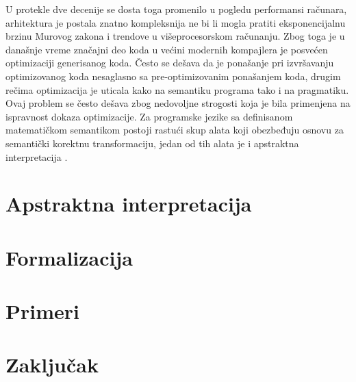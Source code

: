 \documentclass[a4paper]{article}
\begin{document}
U protekle dve decenije se dosta toga promenilo u pogledu performansi računara, arhitektura je postala znatno kompleksnija ne bi li mogla pratiti eksponencijalnu brzinu Murovog zakona i trendove u višeprocesorskom računanju. Zbog toga je u  današnje vreme značajni deo koda u većini modernih kompajlera je posvećen optimizaciji generisanog koda. Često se dešava da je ponašanje pri izvršavanju optimizovanog koda nesaglasno sa pre-optimizovanim ponašanjem koda, drugim rečima optimizacija je uticala kako na semantiku programa tako i na pragmatiku. Ovaj problem se često dešava zbog nedovoljne strogosti koja je bila primenjena na ispravnost dokaza optimizacije. Za programske jezike sa definisanom matematičkom semantikom postoji rastući skup alata koji obezbeđuju osnovu za semantički korektnu transformaciju, jedan od tih alata je i apstraktna interpretacija \cite{AbramskyHankin}. \\



\section{Apstraktna interpretacija}
\label{sec:Apstraktna interpretacija}


\section{Formalizacija} 
\label{sec:Formalizacija}


\section{Primeri}
\label{sec:Primeri}


\section{Zaključak}
\label{sec:zakljucak}
 


\appendix
 

\end{document}
